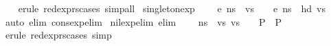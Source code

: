 \begin{isabellebody}
%
\isadelimproof
\ \ %
\endisadelimproof
%
\isatagproof
{}\isamarkupfalse%
\ {\isacharparenleft}{\kern0pt}erule\ red{\isacharunderscore}{\kern0pt}exprs{\isachardot}{\kern0pt}cases{\isacharsemicolon}{\kern0pt}\ simp{\isacharunderscore}{\kern0pt}all{\isacharparenright}{\kern0pt}%
\endisatagproof
{\isafoldproof}%
%
\isadelimproof
\isanewline
%
\endisadelimproof
\isanewline
{}\isamarkupfalse%
\ singleton{\isacharunderscore}{\kern0pt}exp{\isacharcolon}{\kern0pt}\isanewline
\ \ {\isachardoublequoteopen}{\isasymLambda}{\isacharcomma}{\kern0pt}{\isasymGamma}{\isacharcomma}{\kern0pt}{\isasymDelta}\ {\isasymturnstile}\ {\isasymlangle}{\isacharbrackleft}{\kern0pt}e{\isacharbrackright}{\kern0pt}{\isacharcomma}{\kern0pt}\ n{\isacharunderscore}{\kern0pt}s{\isasymrangle}\ {\isacharbrackleft}{\kern0pt}{\isasymDown}{\isacharbrackright}{\kern0pt}\ vs\ {\isasymLongrightarrow}\ {\isasymLambda}{\isacharcomma}{\kern0pt}{\isasymGamma}{\isacharcomma}{\kern0pt}{\isasymDelta}\ {\isasymturnstile}\ {\isasymlangle}e{\isacharcomma}{\kern0pt}\ n{\isacharunderscore}{\kern0pt}s{\isasymrangle}\ {\isasymDown}\ hd\ vs{\isachardoublequoteclose}\isanewline
%
\isadelimproof
\ \ %
\endisadelimproof
%
\isatagproof
{}\isamarkupfalse%
\ {\isacharparenleft}{\kern0pt}auto\ elim{\isacharcolon}{\kern0pt}\ cons{\isacharunderscore}{\kern0pt}exp{\isacharunderscore}{\kern0pt}elim{\isacharparenright}{\kern0pt}%
\endisatagproof
{\isafoldproof}%
%
\isadelimproof
\isanewline
%
\endisadelimproof
\isanewline
{}\isamarkupfalse%
\ nil{\isacharunderscore}{\kern0pt}exp{\isacharunderscore}{\kern0pt}elim\ {\isacharbrackleft}{\kern0pt}elim{\isacharbang}{\kern0pt}{\isacharbrackright}{\kern0pt}{\isacharcolon}{\kern0pt}\isanewline
\ {\isachardoublequoteopen}{\isasymlbrakk}{\isasymLambda}{\isacharcomma}{\kern0pt}{\isasymGamma}{\isacharcomma}{\kern0pt}{\isasymDelta}\ {\isasymturnstile}\ {\isasymlangle}{\isacharbrackleft}{\kern0pt}{\isacharbrackright}{\kern0pt}{\isacharcomma}{\kern0pt}\ n{\isacharunderscore}{\kern0pt}s{\isasymrangle}\ {\isacharbrackleft}{\kern0pt}{\isasymDown}{\isacharbrackright}{\kern0pt}\ vs{\isacharsemicolon}{\kern0pt}\ vs\ {\isacharequal}{\kern0pt}\ {\isacharbrackleft}{\kern0pt}{\isacharbrackright}{\kern0pt}\ {\isasymLongrightarrow}\ P{\isasymrbrakk}\ {\isasymLongrightarrow}\ P{\isachardoublequoteclose}\isanewline
%
\isadelimproof
\ %
\endisadelimproof
%
\isatagproof
{}\isamarkupfalse%
\ {\isacharparenleft}{\kern0pt}erule\ red{\isacharunderscore}{\kern0pt}exprs{\isachardot}{\kern0pt}cases{\isacharsemicolon}{\kern0pt}\ simp{\isacharparenright}{\kern0pt}%

\end{isabellebody}
